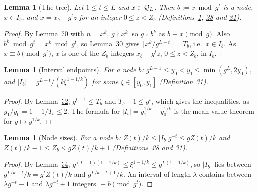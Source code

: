 \documentclass[11pt]{article}
\newcounter{hffc}
\theoremstyle{definition}\newtheorem{hffdef}[hffc]{Definition}
\theoremstyle{plain}\newtheorem{hfflem}[hffc]{Lemma}\newtheorem{hffthm}[hffc]{Theorem}
\theoremstyle{remark}\newtheorem{hffrem}[hffc]{Remark}
\newcommand{\hffcost}{}
\newcommand{\setcost}[1]{\renewcommand{\hffcost}{#1}}
\begin{document}
\begin{hfflem}[The tree]\label{L:tree}
Let $1\le t\le L$ and $x\in\mathcal{Q}_L$. Then $b:=x\bmod g^t$ is a node, $x\in I_b$, and $x=x_b+g^tz$ for an integer $0\le z<Z_b$ (Definitions~\hyperref[D:conv]{1}, \hyperref[D:pal]{28} and \hyperref[D:node]{31}).
\par\nopagebreak{}
\end{hfflem}
\begin{proof}\setcost{length 150/300}By Lemma~\hyperref[L:first]{30} with $n=x^k$, $g\nmid x^k$, so $g\nmid b^k$ as $b\equiv x\pmod g$. Also $b^k\bmod g^t=x^k\bmod g^t$, so Lemma~\hyperref[L:first]{30} gives $\lfloor x^k/g^{L-t}\rfloor=T_b$, i.e.\ $x\in I_b$. As $x\equiv b\pmod{g^t}$, $x$ is one of the $Z_b$ integers $x_b+g^tz$, $0\le z<Z_b$, in $I_b$.
\end{proof}

\begin{hfflem}[Interval endpoints]\label{L:mvt}
For a node $b$: $g^{L-1}\le y_0<y_1\le\min(g^L,2y_0)$, and $|I_b|=g^{L-t}/(k\xi^{1-1/k})$ for some $\xi\in[y_0,y_1]$ (Definition~\hyperref[D:node]{31}).
\par\nopagebreak{}
\end{hfflem}
\begin{proof}\setcost{length 131/300}By Lemma~\hyperref[L:lead]{32}, $g^{t-1}\le T_b$ and $T_b+1\le g^t$, which gives the inequalities, as $y_1/y_0=1+1/T_b\le2$. The formula for $|I_b|=y_1^{1/k}-y_0^{1/k}$ is the mean value theorem for $y\mapsto y^{1/k}$.
\end{proof}

\begin{hfflem}[Node sizes]\label{L:sizes}
For a node $b$: $Z(t)/k\le|I_b|g^{-t}\le gZ(t)/k$ and $Z(t)/k-1\le Z_b\le gZ(t)/k+1$ (Definitions~\hyperref[D:pal]{28} and \hyperref[D:node]{31}).
\par\nopagebreak{}
\end{hfflem}
\begin{proof}\setcost{length 156/300}By Lemma~\hyperref[L:mvt]{34}, $g^{(L-1)(1-1/k)}\le\xi^{1-1/k}\le g^{L(1-1/k)}$, so $|I_b|$ lies between $g^{L/k-t}/k=g^tZ(t)/k$ and $g^{L/k-t+1}/k$. An interval of length $\lambda$ contains between $\lambda g^{-t}-1$ and $\lambda g^{-t}+1$ integers $\equiv b\pmod{g^t}$.
\end{proof}
\end{document}
